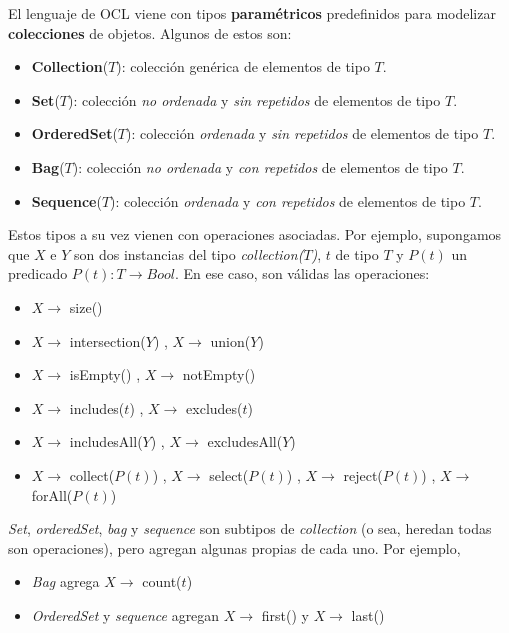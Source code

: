 \documentclass[]{article}
\begin{document}
El lenguaje de OCL viene con tipos \textbf{paramétricos} predefinidos para modelizar \textbf{colecciones} de objetos. Algunos de estos son:
\begin{itemize}
	\item \textbf{Collection}($T$): colección genérica de elementos de tipo $T$.
	\item \textbf{Set}($T$): colección \textit{no ordenada} y \textit{sin repetidos} de elementos de tipo $T$.
	\item \textbf{OrderedSet}($T$): colección \textit{ordenada} y \textit{sin repetidos} de elementos de tipo $T$.
	\item \textbf{Bag}($T$): colección \textit{no ordenada} y \textit{con repetidos} de elementos de tipo $T$.
	\item \textbf{Sequence}($T$): colección \textit{ordenada} y \textit{con repetidos} de elementos de tipo $T$.
\end{itemize}

Estos tipos a su vez vienen con operaciones asociadas. Por ejemplo, supongamos que $X$ e $Y$ son dos instancias del tipo \textit{collection($T$)}, $t$ de tipo $T$ y $P(t)$ un predicado $P(t):T\rightarrow Bool$. En ese caso, son válidas las operaciones:
\begin{itemize}
	\item $X\rightarrow$ size()
	\item $X\rightarrow$ intersection($Y$) , $X\rightarrow$ union($Y$)
	\item $X\rightarrow$ isEmpty() , $X\rightarrow$ notEmpty()
	\item $X\rightarrow$ includes($t$) , $X\rightarrow$ excludes($t$)
	\item $X\rightarrow$ includesAll($Y$) , $X\rightarrow$ excludesAll($Y$)
	\item $X\rightarrow$ collect($P(t)$) , $X\rightarrow$ select($P(t)$) , $X\rightarrow$ reject($P(t)$) , $X\rightarrow$ forAll($P(t)$)
\end{itemize}

\textit{Set}, \textit{orderedSet}, \textit{bag} y \textit{sequence} son subtipos de \textit{collection} (o sea, heredan todas son operaciones), pero agregan algunas propias de cada uno. Por ejemplo,
\begin{itemize}
	\item \textit{Bag} agrega $X\rightarrow$ count($t$)
	\item \textit{OrderedSet} y \textit{sequence} agregan $X\rightarrow$ first() y $X\rightarrow$ last()
\end{itemize}
\end{document}
